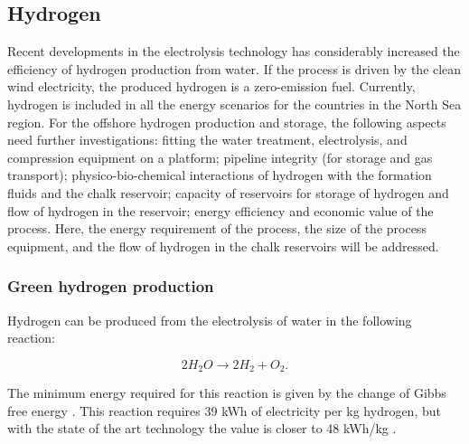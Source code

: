 \documentclass{ECOS_2021}
\begin{document}
\sffamily \subsection{Hydrogen}
\normalsize
Recent developments in the electrolysis technology has considerably
increased the efficiency of hydrogen production from water. If the
process is driven by the clean wind electricity, the produced hydrogen
is a zero-emission fuel. Currently, hydrogen is included in all the
energy scenarios for the countries in the North Sea region. For the
offshore hydrogen production and storage, the following aspects need
further investigations: fitting the water treatment, electrolysis,
and compression equipment on a platform; pipeline integrity (for storage
and gas transport); physico-bio-chemical interactions of hydrogen
with the formation fluids and the chalk reservoir; capacity of reservoirs
for storage of hydrogen and flow of hydrogen in the reservoir; energy
efficiency and economic value of the process. Here, the energy requirement
of the process, the size of the process equipment, and the flow of
hydrogen in the chalk reservoirs will be addressed. 

\sffamily \subsubsection{Green hydrogen production }
\normalsize
Hydrogen can be produced from the electrolysis of water in the following
reaction: 

\[
2H_{2}O\rightarrow2H_{2}+O_{2}.
\]

The minimum energy required for this reaction is given by the change
of Gibbs free energy \cite{rosenEnergyExergyAnalyses1995}. This reaction
requires 39 kWh of electricity per kg hydrogen, but with the state
of the art technology the value is closer to 48 kWh/kg \cite{gardnerHydrogenProductionRenewables2009,ozarslanLargescaleHydrogenEnergy2012}.
\end{document}
